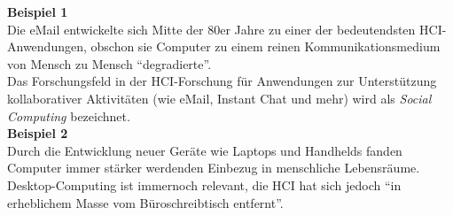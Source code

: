 \textbf{Beispiel 1}
\\
Die eMail entwickelte sich Mitte der 80er Jahre zu einer der bedeutendsten HCI-Anwendungen, obschon sie Computer zu einem reinen Kommunikationsmedium
von Mensch zu Mensch \enquote{degradierte}.\\
Das Forschungsfeld in der HCI-Forschung für Anwendungen zur Unterstützung kollaborativer Aktivitäten (wie eMail, Instant Chat und mehr) wird als  \textit{Social Computing} bezeichnet.
\\
\textbf{Beispiel 2}
\\
Durch die Entwicklung neuer Geräte wie Laptops und Handhelds fanden
Computer immer stärker werdenden Einbezug in menschliche Lebensräume.
Desktop-Computing ist immernoch relevant, die HCI hat sich jedoch
\enquote{in erheblichem Masse vom Büroschreibtisch entfernt}.
